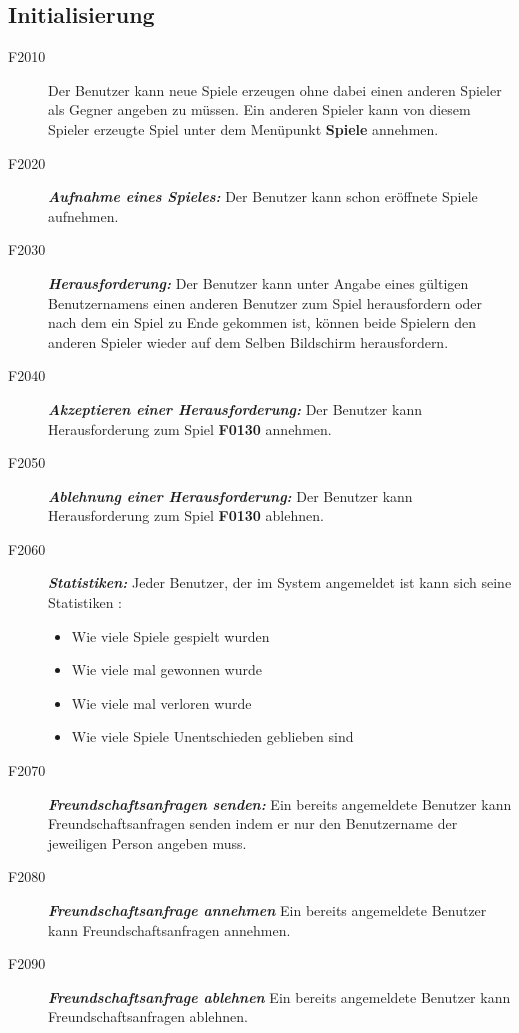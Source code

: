 \documentclass[parskip=full]{scrartcl}
\begin{document}
\subsection{Initialisierung}
\begin{description}
	\item[F2010] Der Benutzer kann neue Spiele erzeugen ohne dabei einen anderen Spieler als Gegner angeben zu müssen. Ein anderen Spieler kann von diesem Spieler erzeugte Spiel unter dem Menüpunkt \textbf{Spiele} annehmen.
	\item[F2020] \textbf{\textit{Aufnahme eines Spieles: }} Der Benutzer kann schon eröffnete Spiele aufnehmen.
	\item[F2030] \textbf{\textit{Herausforderung: }} Der Benutzer kann unter Angabe eines gültigen Benutzernamens einen anderen Benutzer zum Spiel herausfordern oder nach dem ein Spiel zu Ende gekommen ist, können beide Spielern den anderen Spieler wieder auf dem Selben Bildschirm herausfordern.
	\item [F2040] \textbf{\textit{Akzeptieren einer Herausforderung: }} Der Benutzer kann Herausforderung zum Spiel \textbf{F0130} annehmen.
	\item [F2050] \textbf{\textit{Ablehnung einer Herausforderung: }} Der Benutzer kann Herausforderung zum Spiel \textbf{F0130} ablehnen.
	\item [F2060] \textbf{\textit{Statistiken: }} Jeder Benutzer, der im System angemeldet ist kann sich seine Statistiken :
	\begin{itemize}
		\item Wie viele Spiele gespielt wurden
		\item Wie viele mal gewonnen wurde
		\item Wie viele mal verloren wurde
		\item Wie viele Spiele Unentschieden geblieben sind
	\end{itemize}
	\item[F2070] \textbf{\textit{Freundschaftsanfragen senden: }}
	Ein bereits angemeldete Benutzer kann Freundschaftsanfragen senden indem er nur den Benutzername der jeweiligen Person angeben muss.
	\item[F2080] \textbf{\textit{Freundschaftsanfrage annehmen }} Ein bereits angemeldete Benutzer kann Freundschaftsanfragen annehmen.
	\item[F2090] \textbf{\textit{Freundschaftsanfrage ablehnen }} Ein bereits angemeldete Benutzer kann Freundschaftsanfragen ablehnen.
	
\end{description}
\end{document}
